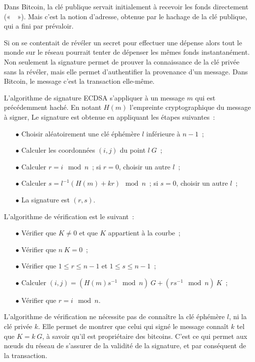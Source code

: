 Dans Bitcoin, la clé publique servait initialement à recevoir les fonds directement («~~»). Mais c'est la notion d'adresse, obtenue par le hachage de la clé publique, qui a fini par prévaloir.


Si on se contentait de révéler un secret pour effectuer une dépense alors tout le monde sur le réseau pourrait tenter de dépenser les mêmes fonds instantanément. Non seulement la signature permet de prouver la connaissance de la clé privée sans la révéler, mais elle permet d'authentifier la provenance d'un message. Dans Bitcoin, le message c'est la transaction elle-même.

L'algorithme de signature ECDSA s'appliquer à un message $m$ qui est précédemment haché. En notant $H(m)$ l'empreinte cryptographique du message à signer, Le signature est obtenue en appliquant les étapes suivantes~: 

\begin{itemize}
  \item[$\bullet$] Choisir aléatoirement une clé éphémère $l$ inférieure à $n-1$~;
  \item[$\bullet$] Calculer les coordonnées $(i,j)$ du point $l~G$~;
  \item[$\bullet$] Calculer $r = i \mod n$~; si $r = 0$, choisir un autre $l$~;
  \item[$\bullet$] Calculer $s = l^{-1} ( H(m) + k r ) \mod n$~; si $s = 0$, choisir un autre $l$~;
  \item[$\bullet$] La signature est $( r, s )$.
\end{itemize}

L'algorithme de vérification est le suivant~:

\begin{itemize}
  \item[$\bullet$] Vérifier que $K \ne 0$ et que $K$ appartient à la courbe~;
  \item[$\bullet$] Vérifier que $n~K = 0$~;
  \item[$\bullet$] Vérifier que $1 \leq r \leq n - 1$ et $1 \leq s \leq n - 1$~;
  \item[$\bullet$] Calculer $(i, j) = ( H(m) s^{-1} \mod n )~G + ( r s^{-1} \mod n  )~K$~;
  \item[$\bullet$] Vérifier que $r = i \mod n$.
\end{itemize}

L'algorithme de vérification ne nécessite pas de connaître la clé éphémère $l$, ni la clé privée $k$. Elle permet de montrer que celui qui signé le message connaît $k$ tel que $K = k~G$, à savoir qu'il est propriétaire des bitcoins. C'est ce qui permet aux nœuds du réseau de s'assurer de la validité de la signature, et par conséquent de la transaction.

